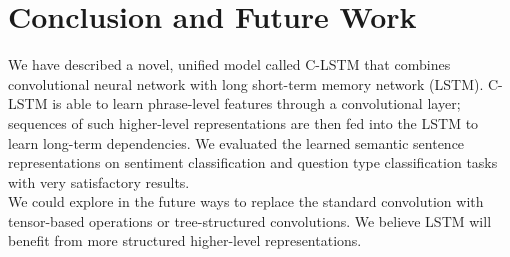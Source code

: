 \documentclass[11pt,letterpaper]{article}
\begin{document}
\section{Conclusion and Future Work}
We have described a novel, unified model called C-LSTM that combines
convolutional neural network with long short-term memory network (LSTM).
C-LSTM is able to learn phrase-level features through a
convolutional layer; sequences of such higher-level
representations are then fed into the LSTM to learn long-term dependencies. We
evaluated the learned semantic sentence representations on sentiment
classification and question type classification tasks with very
satisfactory results.\\
\indent We could explore in the future ways to replace the standard
convolution with tensor-based operations or tree-structured convolutions.
We believe LSTM will benefit from more structured higher-level
representations.



\end{document}
